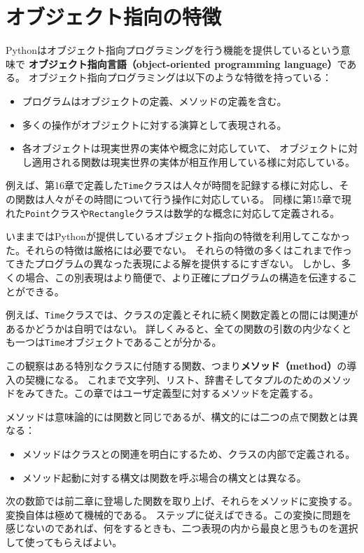 \documentclass[a4j,12pt,makeidx]{jbook}
\begin{document}
\section{オブジェクト指向の特徴}
Pythonはオブジェクト指向プログラミングを行う機能を提供しているという意味で
{\bf オブジェクト指向言語（object-oriented programming language）}である。
オブジェクト指向プログラミングは以下のような特徴を持っている：
\begin{itemize}
\item プログラムはオブジェクトの定義、メソッドの定義を含む。
\item 多くの操作がオブジェクトに対する演算として表現される。
\item 各オブジェクトは現実世界の実体や概念に対応していて、
オブジェクトに対し適用される関数は現実世界の実体が相互作用している様に対応している。
\end{itemize}
例えば、第16章で定義した{\tt Time}クラスは人々が時間を記録する様に対応し、その関数は人々がその時間について行う操作に対応している。
同様に第15章で現れた{\tt Point}クラスや{\tt Rectangle}クラスは数学的な概念に対応して定義される。 \par
いままではPythonが提供しているオブジェクト指向の特徴を利用してこなかった。それらの特徴は厳格には必要でない。
それらの特徴の多くはこれまで作ってきたプログラムの異なった表現による解を提供するにすぎない。
しかし、多くの場合、この別表現はより簡便で、より正確にプログラムの構造を伝達することができる。 \par
例えば、{\tt Time}クラスでは、クラスの定義とそれに続く関数定義との間には関連があるかどうかは自明ではない。
詳しくみると、全ての関数の引数の内少なくとも一つは{\tt Time}オブジェクトであることが分かる。\par
この観察はある特別なクラスに付随する関数、つまり{\bf メソッド（method）}の導入の契機になる。
これまで文字列、リスト、辞書そしてタプルのためのメソッドをみてきた。この章ではユーザ定義型に対するメソッドを定義する。\par
メソッドは意味論的には関数と同じであるが、構文的には二つの点で関数とは異なる：
\begin{itemize}
\item メソッドはクラスとの関連を明白にするため、クラスの内部で定義される。
\item メソッド起動に対する構文は関数を呼ぶ場合の構文とは異なる。
\end{itemize}
次の数節では前二章に登場した関数を取り上げ、それらをメソッドに変換する。変換自体は極めて機械的である。
ステップに従えばできる。この変換に問題を感じないのであれば、何をするときも、二つ表現の内から最良と思うものを選択して使ってもらえばよい。
%
\end{document}
